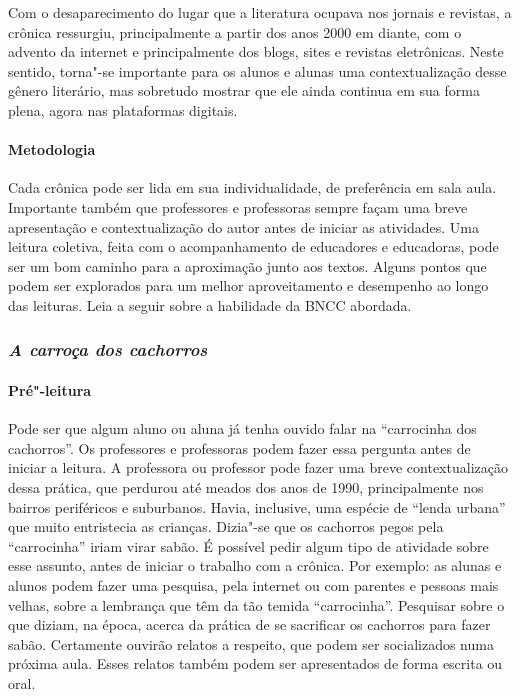 \documentclass[11pt]{extarticle}
\begin{document}
Com o desaparecimento do lugar que a literatura ocupava nos jornais e
revistas, a crônica ressurgiu, principalmente a partir dos anos 2000 em
diante, com o advento da internet e principalmente dos blogs, sites e
revistas eletrônicas. Neste sentido, torna"-se importante para os alunos
e alunas uma contextualização desse gênero literário, mas sobretudo
mostrar que ele ainda continua em sua forma plena, agora nas plataformas
digitais.


\paragraph{Metodologia} Cada crônica pode ser lida em sua individualidade,
de preferência em sala aula. Importante também que professores e professoras 
sempre façam uma breve apresentação e contextualização do
autor antes de iniciar as atividades. Uma leitura coletiva, feita com o
acompanhamento de educadores e educadoras, pode ser um bom caminho para
a aproximação junto aos textos. Alguns pontos que podem ser explorados
para um melhor aproveitamento e desempenho ao longo das leituras.
Leia a seguir sobre a habilidade da BNCC abordada.

\subsubsection{\textit{A carroça dos cachorros}}

\paragraph{Pré"-leitura}

Pode ser que algum aluno ou aluna já tenha ouvido falar na
``carrocinha dos cachorros''. Os professores e professoras podem fazer
essa pergunta antes de iniciar a leitura. A professora ou professor pode
fazer uma breve contextualização dessa prática, que perdurou até meados
dos anos de 1990, principalmente nos bairros periféricos e suburbanos.
Havia, inclusive, uma espécie de ``lenda urbana'' que muito entristecia
as crianças. Dizia"-se que os cachorros pegos pela ``carrocinha'' iriam
virar sabão. É possível pedir algum tipo de atividade sobre esse
assunto, antes de iniciar o trabalho com a crônica. Por exemplo: as
alunas e alunos podem fazer uma pesquisa, pela internet ou com parentes
e pessoas mais velhas, sobre a lembrança que têm da tão temida
``carrocinha''. Pesquisar sobre o que diziam, na época, acerca da
prática de se sacrificar os cachorros para fazer sabão. Certamente
ouvirão relatos a respeito, que podem ser socializados numa próxima
aula. Esses relatos também podem ser apresentados de forma escrita ou
oral. 
\end{document}

